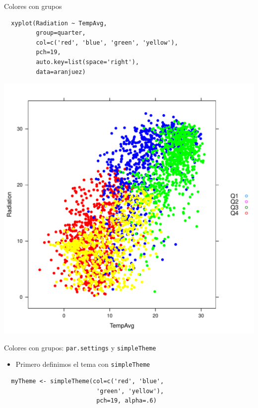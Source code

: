 \documentclass[xcolor={usenames,svgnames,dvipsnames}]{beamer}
\begin{document}
\begin{frame}[fragile,label=sec-2-1-20]{Colores con grupos}
 \lstset{language=R,label= ,caption= ,numbers=none}
\begin{lstlisting}
  xyplot(Radiation ~ TempAvg,
         group=quarter,
         col=c('red', 'blue', 'green', 'yellow'),
         pch=19,
         auto.key=list(space='right'),
         data=aranjuez)
\end{lstlisting}
\end{frame}

\begin{frame}[label=sec-2-1-21]{}
\includegraphics[width=.9\linewidth]{figs/xyplotColorGroups.pdf}
\end{frame}

\begin{frame}[fragile,label=sec-2-1-22]{Colores con grupos: \texttt{par.settings} y \texttt{simpleTheme}}
 \begin{itemize}
\item Primero definimos el tema con \texttt{simpleTheme}
\end{itemize}
\lstset{language=R,label= ,caption= ,numbers=none}
\begin{lstlisting}
  myTheme <- simpleTheme(col=c('red', 'blue',
                          'green', 'yellow'),
                          pch=19, alpha=.6)
\end{lstlisting}
\end{frame}
\end{document}
